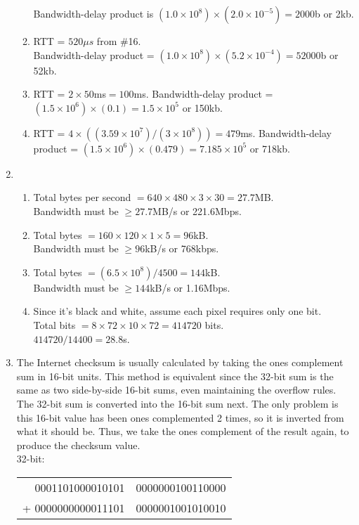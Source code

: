 \documentclass[12pt]{article}
\begin{document}
\begin{enumerate}
\begin{enumerate}
Bandwidth-delay product is $(1.0\times 10^8)\times (2.0\times 10^{-5}) =  2000$b or 2kb.
\item %
RTT = $520\mu s$ from \#16.\\
Bandwidth-delay product = $(1.0\times 10^8)\times (5.2\times 10^{-4}) = 52000$b or 52kb.
\item %
RTT = $2\times 50$ms$ = 100$ms.
Bandwidth-delay product = $(1.5\times 10^6)\times (0.1) = 1.5\times 10^5$ or 150kb.
\item %
RTT = $4\times ((3.59\times 10^7)/(3\times 10^8)) = 479$ms.
Bandwidth-delay product = $(1.5\times 10^6)\times (0.479) = 7.185\times 10^5$ or 718kb.
\end{enumerate}
\item %
\begin{enumerate}
\item %
Total bytes per second $= 640\times 480\times 3\times 30 = 27.7$MB.\\
Bandwidth must be $\geq 27.7$MB/s or 221.6Mbps.
\item %
Total bytes $= 160\times 120\times 1\times 5 = 96$kB.\\
Bandwidth must be $\geq 96$kB/s or 768kbps.
\item %
Total bytes $= (6.5\times 10^8)/4500 = 144$kB.\\
Bandwidth must be $\geq 144$kB/s or 1.16Mbps.
\item %
Since it's black and white, assume each pixel requires only one bit.\\
Total bits $= 8\times 72\times 10\times 72 = 414720$ bits.\\
$414720/14400 = 28.8$s.
\end{enumerate}
\item %
The Internet checksum is usually calculated by taking the ones complement sum in 16-bit units. This method is equivalent since the 32-bit sum is the same as two side-by-side 16-bit sums, even maintaining the overflow rules. The 32-bit sum is converted into the 16-bit sum next. The only problem is this 16-bit value has been ones complemented 2 times, so it is inverted from what it should be. Thus, we take the ones complement of the result again, to produce the checksum value.\\
32-bit:
\begin{center}
\begin{tabular}{r l}
0001101000010101 & 0000000100110000\\
+ 0000000000011101 & 0000001001010010\\\hline

\end{tabular}
\end{center}
\end{enumerate}
\end{document}
